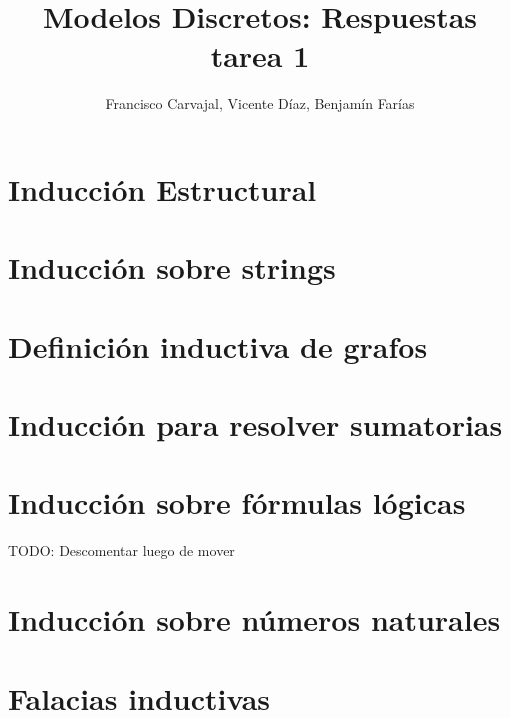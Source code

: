 \documentclass{article}
\title{Modelos Discretos: Respuestas tarea 1}
\author{Francisco Carvajal, Vicente Díaz, Benjamín Farías}
\begin{document}
\maketitle

\newpage
\section{Inducción Estructural}
 

\newpage
\section{Inducción sobre strings}


\newpage
\section{Definición inductiva de grafos}


\newpage
\section{Inducción para resolver sumatorias}


\section{Inducción sobre fórmulas lógicas}
 TODO: Descomentar luego de mover

\newpage
\section{Inducción sobre números naturales}


\newpage
\section{Falacias inductivas}

\end{document}

